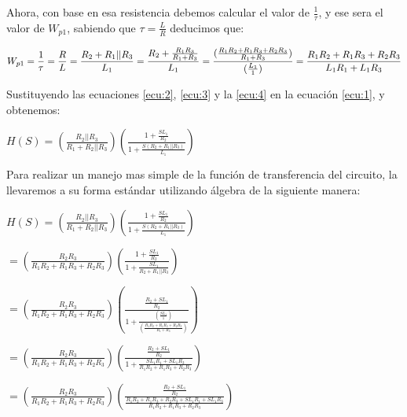 \documentclass[letterpaper,spanish,12pt]{report}
\begin{document}
Ahora, con base en esa resistencia debemos calcular el valor de $\frac{1}{\tau}$, y ese sera el valor de $W_{p1}$, sabiendo que $\tau = \frac {L} {R}$ deducimos que:

	\begin{equation}
		\centering
		W_{p1} = \frac{1}{\tau} = \frac{R}{L} = \frac{R_{2} + R_{1}||R_{3}}{L_{1}} = \frac{ R_{2}+\frac{R_{1}R_{3}}{R_{1}+R_{3}} }{L_{1}} = \frac{ (\frac{R_{1}R_{2}+R_{1}R_{3}+R_{2}R_{3}}{R_{1}+R_{3}}) }{(\frac{L_{1}}{1})} = \frac{R_{1}R_{2}+R_{1}R_{3}+R_{2}R_{3}}{L_{1}R_{1}+L_{1}R_{3}}
		\label{ecu:4}
	\end{equation}

Sustituyendo las ecuaciones \ref{ecu:2}, \ref{ecu:3} y la \ref{ecu:4} en la ecuaci\'on \ref{ecu:1}, y obtenemos:

	\begin{center} $H(S) = ( \frac{R_2||R_{3}}{R_{1}+R_2||R_{3}} ) (\frac{1+\frac{SL_{1}}{R_{2}}}{1+\frac{S(R_{2}+R_{1}||R_{3})}{L_{1}}})$ \end{center}

Para realizar un manejo mas simple de la funci\'on de transferencia del circuito, la llevaremos a su forma est\'andar utilizando \'algebra de la siguiente manera:

\begin{center}$H(S) = ( \frac{R_2||R_{3}}{R_{1}+R_2||R_{3}} ) (\frac{1+\frac{SL_{1}}{R_{2}}}{1+\frac{S(R_{2}+R_{1}||R_{3})}{L_{1}}})$\end{center}

\begin{center}$= (\frac{R_{2}R_{3}}{R_{1}R_{2}+R_{1}R_{3}+R_{2}R_{3}})(\frac{1+\frac{SL_{1}}{R_{2}}}{1+\frac{SL_{1}}{R_{2}+R_{1}||R_{3}}})$\end{center}

\begin{center}$= (\frac{R_{2}R_{3}}{R_{1}R_{2}+R_{1}R_{3}+R_{2}R_{3}})(\frac{\frac{R_{2}+SL_{1}}{R_{2}}}{1+\frac{(\frac{SL_{1}}{1})}{(\frac{R_{1}R_{2}+R_{1}R_{3}+R_{2}R_{3}}{R_{1}+R_{3}})}})$\end{center}

\begin{center}$= (\frac{R_{2}R_{3}}{R_{1}R_{2}+R_{1}R_{3}+R_{2}R_{3}})(\frac{\frac{R_{2}+SL_{1}}{R_{2}}}{1+\frac{SL_{1}R_{1}+SL_{1}R_{3}}{R_{1}R_{2}+R_{1}R_{3}+R_{2}R_{3}}})$\end{center}

\begin{center}$= (\frac{R_{2}R_{3}}{R_{1}R_{2}+R_{1}R_{3}+R_{2}R_{3}})(\frac{\frac{R_{2}+SL_{1}}{R_{2}}}{\frac{R_{1}R_{2}+R_{1}R_{3}+R_{2}R_{3}+SL_{1}R_{1}+SL_{1}R_{3}}{R_{1}R_{2}+R_{1}R_{3}+R_{2}R_{3}}})$\end{center}
\end{document}
